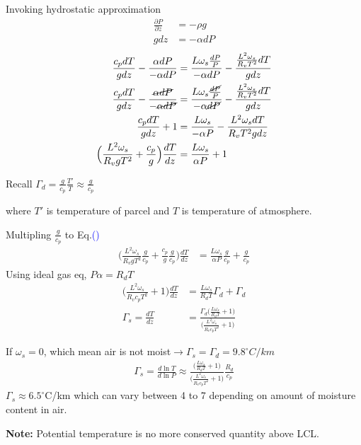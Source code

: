 \documentclass[fleqn,10pt]{SelfArx} %
\newcommand{\myeqref}[1]{\textcolor{blue}{\textup{(\getrefnumber{#1})}}}
\begin{document}
Invoking hydrostatic approximation
\begin{align}
    \frac{\partial P}{\partial z} &= -\rho g \\
    gdz &= -\alpha dP
\end{align}
\begin{align}
    \frac{c_pdT}{gdz} - \frac{\alpha dP}{-\alpha dP} &= \frac{L\omega_s \frac{dP}{P}}{-\alpha dP} - \frac{\frac{L^2\omega_s}{R_vT^2}dT}{gdz} \\
    \frac{c_pdT}{gdz} - \frac{\cancel{\alpha dP}}{-\cancel{\alpha dP}} &= \frac{L\omega_s \frac{\cancel{dP}}{P}}{-\alpha \cancel{dP}} - \frac{\frac{L^2\omega_s}{R_vT^2}dT}{gdz} \\
    \frac{c_pdT}{gdz} + 1 &= \frac{L\omega_s}{-\alpha P} - \frac{L^2\omega_sdT}{R_v T^2 gdz}\\
    \Big(\frac{L^2\omega_s}{R_v g T^2} + \frac{c_p}{g}\Big)\frac{dT}{dz} &= \frac{L\omega_s}{\alpha P} +1 \label{eq:lapse_rate}
\end{align}

Recall $\Gamma_d=\frac{g}{c_p}\frac{T'}{T} \approx \frac{g}{c_p}$

where $T'$ is temperature of parcel and $T$ is temperature of atmosphere.

Multipling $\frac{g}{c_p}$ to Eq.\myeqref{eq:lapse_rate}
\begin{align}
    \Big(\frac{L^2\omega_s}{R_v g T^2}\frac{g}{c_p} + \frac{c_p}{g}\frac{g}{c_p} \Big)\frac{dT}{dz} &= \frac{L\omega_s}{\alpha P}\frac{g}{c_p} + \frac{g}{c_p}
\end{align}
Using ideal gas eq, $P\alpha = R_dT$
\begin{align}
    \Big(\frac{L^2\omega_s}{R_v c_p T^2} + 1\Big)\frac{dT}{dz} &= \frac{L\omega_s}{R_d T}\Gamma_d + \Gamma_d \\
   \Gamma_s = \frac{dT}{dz} &= \frac{\Gamma_d \Big(\frac{L\omega_s}{R_d T} + 1\Big)}{\Big(\frac{L^2\omega_s}{R_v c_p T^2} + 1\Big)}
\end{align}

If $\omega_s=0$, which mean air is not moist$\rightarrow$$\Gamma_s=\Gamma_d=9.8^\circ C/km$
\begin{align}
    \Gamma_s = \frac{d\ln T}{d\ln P} \approx \frac{\Big(\frac{L\omega_s}{R_dT} + 1\Big)}{\Big(\frac{L^2\omega_s}{R_v c_p T^2} + 1\Big)}\frac{R_d}{c_p}
\end{align}
$\Gamma_s \approx 6.5^\circ$C/km which can vary between 4 to 7 depending on amount of moisture content in air.

\textbf{Note:} Potential temperature is no more conserved quantity above LCL. 
\end{document}

